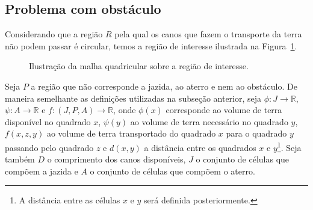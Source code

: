 \subsection{Problema com obstáculo}
Considerando que a região $R$ pela qual os canos que fazem o transporte da terra
não podem passar é circular, temos a região de interesse ilustrada na
Figura~\ref{fig:disc_J_A_R}.
\begin{figure}[!htb]
    \centering
    \caption{Ilustra\c{c}\~{a}o da malha quadricular sobre a regi\~{a}o de
    interesse.}
    \label{fig:disc_J_A_R}
\end{figure}

Seja $P$ a região que não corresponde a jazida, ao aterro e nem ao obstáculo.
De maneira semelhante as definições utilizadas na subseção anterior, seja $\phi
: J \to \mathbb{R}$, $\psi: A \to \mathbb{R}$ e $f: (J, P, A) \to \mathbb{R}$,
onde $\phi(x)$ corresponde ao volume de terra disponível no quadrado $x$,
$\psi(y)$ ao volume de terra necessário no quadrado $y$, $f(x, z, y)$ ao volume
de terra transportado do quadrado $x$ para o quadrado $y$ passando pelo quadrado
$z$ e $d(x, y)$ a distância entre os quadrados $x$ e $y$\footnote{A distância
entre as células $x$ e $y$ será definida posteriormente.}. Seja também $D$ o
comprimento dos canos disponíveis, $J$ o conjunto de células que compõem a
jazida e $A$ o conjunto de células que compõem o aterro.


